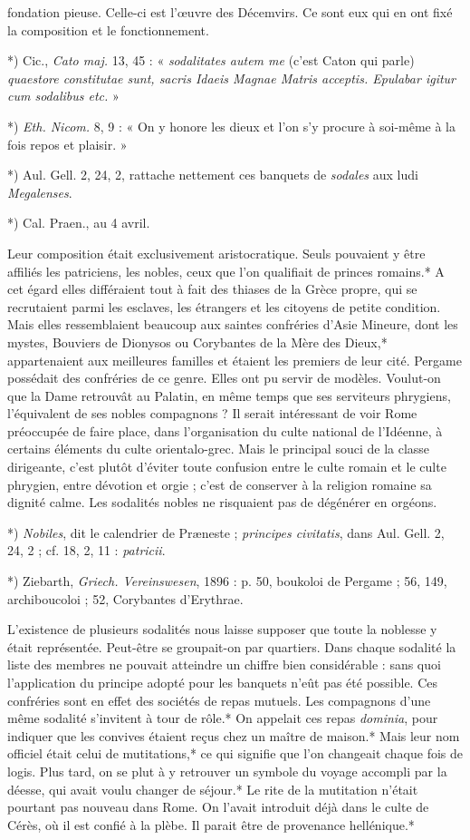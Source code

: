 \documentclass[a4paper, 11pt, oneside, polutonikogreek, french]{article}
\begin{document}
fondation pieuse. Celle-ci est l'œuvre des Décemvirs. Ce sont eux qui en ont fixé la composition et le fonctionnement.

*) Cic., \emph{Cato maj.} 13, 45 : « \emph{sodalitates autem me} (c'est Caton qui parle) \emph{quaestore constitutae sunt, sacris Idaeis Magnae Matris acceptis. Epulabar igitur cum sodalibus etc.} »

*) \emph{Eth. Nicom.} 8, 9 : « On y honore les dieux et l'on s'y procure à soi-même à la fois repos et plaisir. »

*) Aul. Gell. 2, 24, 2, rattache nettement ces banquets de \emph{sodales} aux ludi \emph{Megalenses}.

*) Cal. Praen., au 4 avril.

Leur composition était exclusivement aristocratique. Seuls pouvaient y être affiliés les patriciens, les nobles, ceux que l'on qualifiait de princes romains.* A cet égard elles différaient tout à fait des thiases de la Grèce propre, qui se recrutaient parmi les esclaves, les étrangers et les citoyens de petite condition. Mais elles ressemblaient beaucoup aux saintes confréries d'Asie Mineure, dont les mystes, Bouviers de Dionysos ou Corybantes de la Mère des Dieux,* appartenaient aux meilleures familles et étaient les premiers de leur cité. Pergame possédait des confréries de ce genre. Elles ont pu servir de modèles. Voulut-on que la Dame retrouvât au Palatin, en même temps que ses serviteurs phrygiens, l'équivalent de ses nobles compagnons ? Il serait intéressant de voir Rome préoccupée de faire place, dans l'organisation du culte national de l'Idéenne, à certains éléments du culte orientalo-grec. Mais le principal souci de la classe dirigeante, c'est plutôt d'éviter toute confusion entre le culte romain et le culte phrygien, entre dévotion et orgie ; c'est de conserver à la religion romaine sa dignité calme. Les sodalités nobles ne risquaient pas de dégénérer en orgéons.

*) \emph{Nobiles}, dit le calendrier de Præneste ; \emph{principes civitatis}, dans Aul. Gell. 2, 24, 2 ; cf. 18, 2, 11 : \emph{patricii}.

*) Ziebarth, \emph{Griech. Vereinswesen}, 1896 : p. 50, boukoloi de Pergame ; 56, 149, archiboucoloi ; 52, Corybantes d'Erythrae.

L'existence de plusieurs sodalités nous laisse supposer que toute la noblesse y était représentée. Peut-être se groupait-on par quartiers. Dans chaque sodalité la liste des membres ne pouvait atteindre un chiffre bien considérable : sans quoi l'application du principe adopté pour les banquets n'eût pas été possible. Ces confréries sont en effet des sociétés de repas mutuels. Les compagnons d'une même sodalité s'invitent à tour de rôle.* On appelait ces repas \emph{dominia}, pour indiquer que les convives étaient reçus chez un maître de maison.* Mais leur nom officiel était celui de mutitations,* ce qui signifie que l'on changeait chaque fois de logis. Plus tard, on se plut à y retrouver un symbole du voyage accompli par la déesse, qui avait voulu changer de séjour.* Le rite de la mutitation n'était pourtant pas nouveau dans Rome. On l'avait introduit déjà dans le culte de Cérès, où il est confié à la plèbe. Il parait être de provenance hellénique.*
\end{document}
